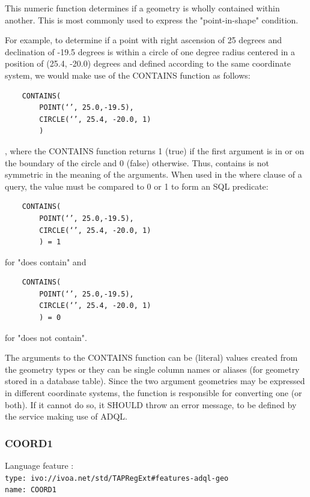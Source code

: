 \documentclass[11pt,a4paper]{ivoa}
\begin{document}
This numeric function determines if a geometry is wholly contained within
another. This is most commonly used to express the "point-in-shape" condition.

For example, to determine if a point with right ascension of 25 degrees
and declination of -19.5 degrees is within a circle of one degree radius
centered in a position of (25.4, -20.0) degrees and defined according to the
same coordinate system, we would make use of the CONTAINS function as follows:

\begin{verbatim}
    CONTAINS(
        POINT(‘’, 25.0,-19.5),
        CIRCLE(‘’, 25.4, -20.0, 1)
        )
\end{verbatim}

, where the CONTAINS function returns 1 (true) if the first argument is in
or on the boundary of the circle and 0 (false) otherwise. Thus, contains is
not symmetric in the meaning of the arguments. When used in the where clause
of a query, the value must be compared to 0 or 1 to form an SQL predicate:

\begin{verbatim}
    CONTAINS(
        POINT(‘’, 25.0,-19.5),
        CIRCLE(‘’, 25.4, -20.0, 1)
        ) = 1
\end{verbatim}

for "does contain" and

\begin{verbatim}
    CONTAINS(
        POINT(‘’, 25.0,-19.5),
        CIRCLE(‘’, 25.4, -20.0, 1)
        ) = 0
\end{verbatim}

for "does not contain".

The arguments to the CONTAINS function can be (literal) values created
from the geometry types or they can be single column names or aliases (for
geometry stored in a database table). Since the two argument geometries may
be expressed in different coordinate systems, the function is responsible
for converting one (or both). If it cannot do so, it SHOULD throw an error
message, to be defined by the service making use of ADQL.

\subsubsection{COORD1}
\label{sec:geom.functions.coord1}
{\footnotesize Language feature :}\\
{\footnotesize \verb|type: ivo://ivoa.net/std/TAPRegExt#features-adql-geo|}\\
{\footnotesize \verb|name: COORD1|}\\
\end{document}
